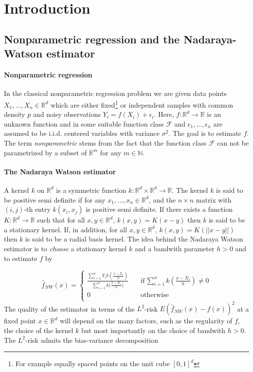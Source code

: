 \documentclass{article}
\begin{document}
\tableofcontents




\section{Introduction}
\subsection{Nonparametric regression and the Nadaraya-Watson estimator}


\paragraph{Nonparametric regression} In the classical nonparametric regression problem  we are given data points  $X_1,...,X_n\in\mathbb{R}^d$ which are either fixed\footnote{For example equally spaced points on the unit cube $[0,1]^d$} or independent samples with common density $p$ and  
noisy observations $Y_i=f(X_i)+\epsilon_i$. Here,  $f\colon\mathbb{R}^d\to\mathbb{R}$ is an unknown function and in some suitable function class   $\mathcal{F}$ and
$\epsilon_1,...,\epsilon_n$ are assumed to be i.i.d. centered variables with variance $\sigma^2$. The goal is to estimate $f$. The term \textit{nonparametric} stems from the fact that the function class $\mathcal{F}$ can not be parametrized by a  subset of $\mathbb{R}^m$ for any $m\in \mathbb{N}$.

\paragraph{The Nadaraya Watson estimator} A kernel $k$ on $\mathbb{R}^d$ is a symmetric function $k:\mathbb{R}^d\times\mathbb{R}^d\rightarrow \mathbb{R}$. The kernel $k$ is said to be positive semi definite if for any $x_1,...,x_n\in\mathbb{R}^d$, and the $n\times n$ matrix with $(i,j)$-th entry $k(x_i,x_j)$ is positive semi definite. If there exists a function $K\colon\mathbb{R}^d\to\mathbb{R}$ such that for all $x,y\in\mathbb{R}^d$, $k(x,y)=K(x-y)$ then $k$ is said to be a stationary kernel. If, in addition, for all $x,y\in\mathbb{R}^d$, $k(x,y)=K(||x-y||)$ then $k$ is said to be a radial basis kernel. The idea behind the Nadaraya Watson estimator is to \textit{choose} a stationary kernel $k$ and a bandwith parameter $h>0$ and to estimate $f$ by

\begin{equation}
\label{NW_def}
    \hat{f}_{NW}(x)=\begin{cases}
    \frac{\sum_{i=1}^nY_ik(\frac{x-X_i}{h})}{\sum_{i=1}^n{k(\frac{x-X_i}{h}})} \quad &\text{if}\, \sum_{i=1}^n 
    k(\frac{x-X_i}{h})\neq 0\\
    0 \quad &\text{otherwise}\\
    \end{cases}
\end{equation}
The quality of the estimator in terms of the $L^2$-risk $E(\hat{f}_{NW}(x)-f(x))^2$ at a fixed point $x\in\mathbb{R}^d$ will depend on the many factors, such as the regularity of $f$, the choice of the kernel $k$ but most importantly on the choice of bandwith $h>0$. The $L^2$-risk admits the bias-variance decomposition
\end{document}
